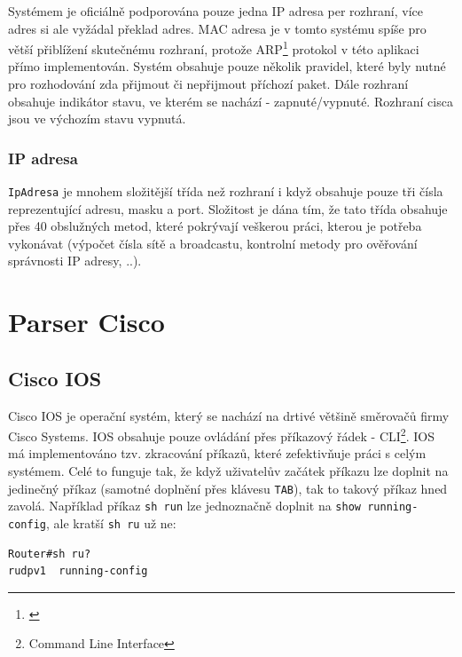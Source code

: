 Systémem je oficiálně podporována pouze jedna IP adresa per rozhraní, více adres si ale vyžádal překlad adres. MAC adresa je v tomto systému spíše pro větší přiblížení skutečnému rozhraní, protože ARP\footnote{\cite{wiki:arp}} protokol v této aplikaci přímo implementován. Systém obsahuje pouze několik pravidel, které byly nutné pro rozhodování zda přijmout či nepřijmout příchozí paket. Dále rozhraní obsahuje indikátor stavu, ve kterém se nachází - zapnuté/vypnuté. Rozhraní cisca jsou ve výchozím stavu vypnutá.

\newpage

\subsubsection{IP adresa}
\verb|IpAdresa| je mnohem složitější třída než rozhraní i když obsahuje pouze tři čísla reprezentující adresu, masku a port. Složitost je dána tím, že tato třída obsahuje přes 40 obslužných metod, které pokrývají veškerou práci, kterou je potřeba vykonávat (výpočet čísla sítě a broadcastu, kontrolní metody pro ověřování správnosti IP adresy, ..).


\section{Parser Cisco}

\subsection{Cisco IOS}
Cisco IOS je operační systém, který se nachází na drtivé většině směrovačů firmy Cisco Systems. IOS obsahuje pouze ovládání přes příkazový řádek - CLI\footnote{Command Line Interface}. IOS má implementováno tzv. zkracování příkazů, které zefektivňuje práci s celým systémem. Celé to funguje tak, že když uživatelův začátek příkazu lze doplnit na jedinečný příkaz (samotné doplnění přes klávesu \verb|TAB|), tak to takový příkaz hned zavolá. Například příkaz \verb|sh run| lze jednoznačně doplnit na \verb|show running-config|, ale kratší \verb|sh ru| už ne:
\begin{verbatim}
Router#sh ru?
rudpv1  running-config
\end{verbatim} 

